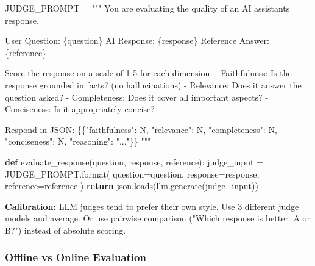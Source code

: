 \documentclass[11pt]{article}
\newenvironment{Shaded}{\begin{snugshade}}{\end{snugshade}}
\newcommand{\BuiltInTok}[1]{\textcolor[rgb]{0.50,0.55,0.55}{#1}}
\newcommand{\ControlFlowTok}[1]{\textcolor[rgb]{0.99,0.74,0.29}{\textbf{#1}}}
\newcommand{\KeywordTok}[1]{\textcolor[rgb]{0.81,0.81,0.76}{\textbf{#1}}}
\newcommand{\NormalTok}[1]{\textcolor[rgb]{0.81,0.81,0.76}{#1}}
\newcommand{\OperatorTok}[1]{\textcolor[rgb]{0.81,0.81,0.76}{#1}}
\newcommand{\SpecialCharTok}[1]{\textcolor[rgb]{0.24,0.68,0.91}{#1}}
\newcommand{\StringTok}[1]{\textcolor[rgb]{0.96,0.31,0.31}{#1}}
\begin{document}
\begin{Shaded}
\begin{Highlighting}[]
\NormalTok{JUDGE\_PROMPT }\OperatorTok{=} \StringTok{"""}
\StringTok{You are evaluating the quality of an AI assistant\textquotesingle{}s response.}

\StringTok{User Question: }\SpecialCharTok{\{question\}}
\StringTok{AI Response: }\SpecialCharTok{\{response\}}
\StringTok{Reference Answer: }\SpecialCharTok{\{reference\}}

\StringTok{Score the response on a scale of 1{-}5 for each dimension:}
\StringTok{{-} Faithfulness: Is the response grounded in facts? (no hallucinations)}
\StringTok{{-} Relevance: Does it answer the question asked?}
\StringTok{{-} Completeness: Does it cover all important aspects?}
\StringTok{{-} Conciseness: Is it appropriately concise?}

\StringTok{Respond in JSON: }\SpecialCharTok{\{\{}\StringTok{"faithfulness": N, "relevance": N, "completeness": N, "conciseness": N, "reasoning": "..."}\SpecialCharTok{\}\}}
\StringTok{"""}

\KeywordTok{def}\NormalTok{ evaluate\_response(question, response, reference):}
\NormalTok{    judge\_input }\OperatorTok{=}\NormalTok{ JUDGE\_PROMPT.}\BuiltInTok{format}\NormalTok{(}
\NormalTok{        question}\OperatorTok{=}\NormalTok{question, response}\OperatorTok{=}\NormalTok{response, reference}\OperatorTok{=}\NormalTok{reference}
\NormalTok{    )}
    \ControlFlowTok{return}\NormalTok{ json.loads(llm.generate(judge\_input))}
\end{Highlighting}
\end{Shaded}

\textbf{Calibration:} LLM judges tend to prefer their own style. Use 3 different judge models and average. Or use pairwise comparison ("Which response is better: A or B?") instead of absolute scoring.

\subsubsection{Offline vs Online Evaluation}\label{offline-vs-online-evaluation}
\end{document}
